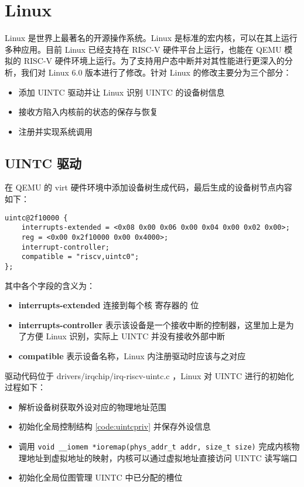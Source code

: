 \section{Linux}

Linux 是世界上最著名的开源操作系统。Linux 是标准的宏内核，可以在其上运行多种应用。目前 Linux 已经支持在 RISC-V 硬件平台上运行，也能在 QEMU 模拟的 RISC-V 硬件环境上运行。为了支持用户态中断并对其性能进行更深入的分析，我们对 Linux 6.0 版本进行了修改。针对 Linux 的修改主要分为三个部分：

\begin{itemize}
    \item 添加 UINTC 驱动并让 Linux 识别 UINTC 的设备树信息
    \item 接收方陷入内核前的状态的保存与恢复
    \item 注册并实现系统调用
\end{itemize}

\subsection{UINTC 驱动}

在 QEMU 的 virt 硬件环境中添加设备树生成代码，最后生成的设备树节点内容如下：

\lstset{basicstyle=\footnotesize\tt}
\begin{lstlisting}
uintc@2f10000 {
    interrupts-extended = <0x08 0x00 0x06 0x00 0x04 0x00 0x02 0x00>;
    reg = <0x00 0x2f10000 0x00 0x4000>;
    interrupt-controller;
    compatible = "riscv,uintc0";
};
\end{lstlisting}

其中各个字段的含义为：

\begin{itemize}
    \item \textbf{interrupts-extended} 连接到每个核 \Ruip 寄存器的 \FcsrUipUsip 位
    \item \textbf{interrupts-controller} 表示该设备是一个接收中断的控制器，这里加上是为了方便 Linux 识别，实际上 UINTC 并没有接收外部中断
    \item \textbf{compatible} 表示设备名称，Linux 内注册驱动时应该与之对应
\end{itemize}

驱动代码位于 drivers/irqchip/irq-riscv-uintc.c ，Linux 对 UINTC 进行的初始化过程如下：

\begin{itemize}
    \item 解析设备树获取外设对应的物理地址范围
    \item 初始化全局控制结构 \ref{code:uintcpriv} 并保存外设信息
    \item 调用 \texttt{void __iomem *ioremap(phys_addr_t addr, size_t size)} 完成内核物理地址到虚拟地址的映射，内核可以通过虚拟地址直接访问 UINTC 读写端口
    \item 初始化全局位图管理 UINTC 中已分配的槽位
\end{itemize}

